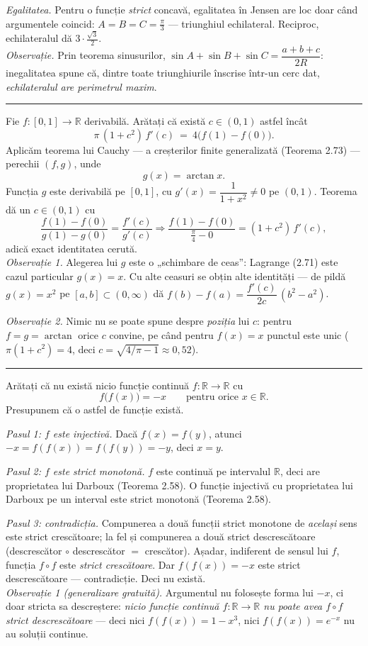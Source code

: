 \emph{Egalitatea.} Pentru o funcție \emph{strict} concavă, egalitatea în Jensen are loc doar când argumentele coincid: $A=B=C=\frac\pi3$ --- triunghiul echilateral. Reciproc, echilateralul dă $3\cdot\frac{\sqrt3}2$.\\[2pt]
\emph{Observație.} Prin teorema sinusurilor, $\sin A+\sin B+\sin C=\dfrac{a+b+c}{2R}$: inegalitatea spune că, dintre toate triunghiurile înscrise într-un cerc dat, \emph{echilateralul are perimetrul maxim}.
\vspace{1mm}\hrule

Fie $f:[0,1]\to\mathbb{R}$ derivabilă. Arătați că există $c\in(0,1)$ astfel încât
\[ \pi\,(1+c^{2})\,f'(c)\ =\ 4\bigl(f(1)-f(0)\bigr) . \]
\sol Aplicăm teorema lui Cauchy --- a creșterilor finite generalizată (Teorema 2.73) --- perechii $(f,g)$, unde
\[ g(x)=\arctan x . \]
Funcția $g$ este derivabilă pe $[0,1]$, cu $g'(x)=\dfrac{1}{1+x^{2}}\neq0$ pe $(0,1)$. Teorema dă un $c\in(0,1)$ cu
\[ \frac{f(1)-f(0)}{g(1)-g(0)}=\frac{f'(c)}{g'(c)} \Longrightarrow \frac{f(1)-f(0)}{\frac\pi4-0}=(1+c^{2})\,f'(c) , \]
adică exact identitatea cerută.\\[2pt]
\emph{Observație 1.} Alegerea lui $g$ este o „schimbare de ceas'': Lagrange (2.71) este cazul particular $g(x)=x$. Cu alte ceasuri se obțin alte identități --- de pildă $g(x)=x^{2}$ pe $[a,b]\subset(0,\infty)$ dă $f(b)-f(a)=\dfrac{f'(c)}{2c}\,(b^{2}-a^{2})$.

\emph{Observație 2.} Nimic nu se poate spune despre \emph{poziția} lui $c$: pentru $f=g=\arctan$ orice $c$ convine, pe când pentru $f(x)=x$ punctul este unic ($\pi(1+c^{2})=4$, deci $c=\sqrt{4/\pi-1}\approx0{,}52$).
\vspace{1mm}\hrule

Arătați că nu există nicio funcție continuă $f:\mathbb{R}\to\mathbb{R}$ cu
\[ f\bigl(f(x)\bigr)=-x\qquad\text{pentru orice }x\in\mathbb{R} . \]
\sol Presupunem că o astfel de funcție există.

\emph{Pasul 1: $f$ este injectivă.} Dacă $f(x)=f(y)$, atunci $-x=f(f(x))=f(f(y))=-y$, deci $x=y$.

\emph{Pasul 2: $f$ este strict monotonă.} $f$ este continuă pe intervalul $\mathbb{R}$, deci are proprietatea lui Darboux (Teorema 2.58). O funcție injectivă cu proprietatea lui Darboux pe un interval este strict monotonă (Teorema 2.58).

\emph{Pasul 3: contradicția.} Compunerea a două funcții strict monotone de \emph{același} sens este strict crescătoare; la fel și compunerea a două strict descrescătoare (descrescător $\circ$ descrescător $=$ crescător). Așadar, indiferent de sensul lui $f$, funcția $f\circ f$ este \emph{strict crescătoare}. Dar $f(f(x))=-x$ este strict descrescătoare --- contradicție. Deci nu există.\\[2pt]
\emph{Observație 1 (generalizare gratuită).} Argumentul nu folosește forma lui $-x$, ci doar stricta sa descreștere: \emph{nicio funcție continuă $f:\mathbb{R}\to\mathbb{R}$ nu poate avea $f\circ f$ strict descrescătoare} --- deci nici $f(f(x))=1-x^{3}$, nici $f(f(x))=e^{-x}$ nu au soluții continue.

